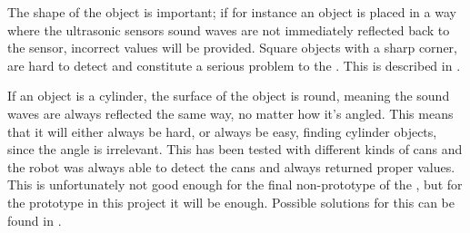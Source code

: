 The shape of the object is important; if for instance an object is placed in a way where the ultrasonic sensors sound waves are not immediately reflected back to the sensor, incorrect values will be provided. Square objects with a sharp corner, are hard to detect and constitute a serious problem to the \projname{}. This is described in . 

If an object is a cylinder, the surface of the object is round, meaning the sound waves are always reflected the same way, no matter how it's angled. This means that it will either always be hard, or always be easy, finding cylinder objects, since the angle is irrelevant. This has been tested with different kinds of cans and the robot was always able to detect the cans and always returned proper values. This is unfortunately not good enough for the final non-prototype of the \projname{}, but for the prototype in this project it will be enough. Possible solutions for this can be found in .








